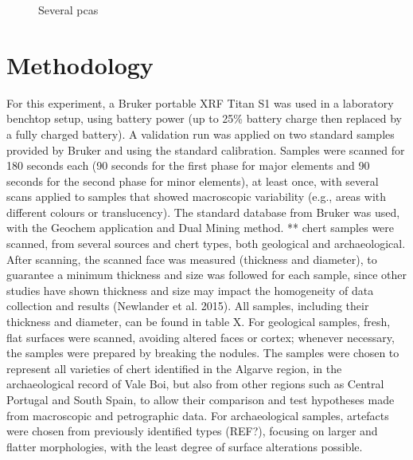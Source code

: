 \documentclass[
  a4paper,
  DIV=11,
  numbers=noendperiod]{scrreprt}
\begin{document}
\begin{figure}


\caption{\label{fig-pca}Several pcas}

\end{figure}%

\section{Methodology}\label{methodology}

For this experiment, a Bruker portable XRF Titan S1 was used in a
laboratory benchtop setup, using battery power (up to 25\% battery
charge then replaced by a fully charged battery). A validation run was
applied on two standard samples provided by Bruker and using the
standard calibration. Samples were scanned for 180 seconds each (90
seconds for the first phase for major elements and 90 seconds for the
second phase for minor elements), at least once, with several scans
applied to samples that showed macroscopic variability (e.g., areas with
different colours or translucency). The standard database from Bruker
was used, with the Geochem application and Dual Mining method. ** chert
samples were scanned, from several sources and chert types, both
geological and archaeological. After scanning, the scanned face was
measured (thickness and diameter), to guarantee a minimum thickness and
size was followed for each sample, since other studies have shown
thickness and size may impact the homogeneity of data collection and
results (Newlander et al. 2015). All samples, including their thickness
and diameter, can be found in table X. For geological samples, fresh,
flat surfaces were scanned, avoiding altered faces or cortex; whenever
necessary, the samples were prepared by breaking the nodules. The
samples were chosen to represent all varieties of chert identified in
the Algarve region, in the archaeological record of Vale Boi, but also
from other regions such as Central Portugal and South Spain, to allow
their comparison and test hypotheses made from macroscopic and
petrographic data. For archaeological samples, artefacts were chosen
from previously identified types (REF?), focusing on larger and flatter
morphologies, with the least degree of surface alterations possible.
\end{document}
